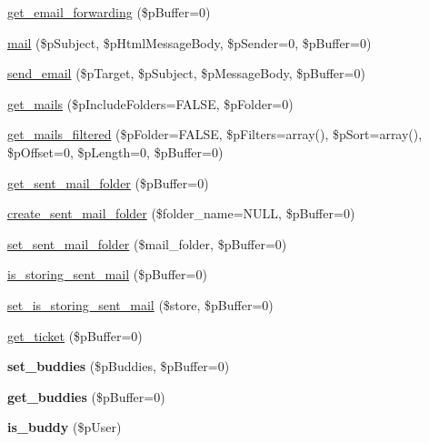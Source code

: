 \begin{DoxyCompactItemize}
\item 
\hyperlink{classsteam__user_a84e901020dbe6b08ec9b691afc1f3b4c}{get\_\-email\_\-forwarding} (\$pBuffer=0)
\item 
\hyperlink{classsteam__user_a590b6e07fd3ee5d89753bea3f21ae70f}{mail} (\$pSubject, \$pHtmlMessageBody, \$pSender=0, \$pBuffer=0)
\item 
\hyperlink{classsteam__user_aabd230d6d6fd52a056b9f89e94cf31a9}{send\_\-email} (\$pTarget, \$pSubject, \$pMessageBody, \$pBuffer=0)
\item 
\hyperlink{classsteam__user_a342e1ddf9c270fbaea22f87d6fb084cd}{get\_\-mails} (\$pIncludeFolders=FALSE, \$pFolder=0)
\item 
\hyperlink{classsteam__user_afb78b3bc39a24fd19682b82d062bf5b9}{get\_\-mails\_\-filtered} (\$pFolder=FALSE, \$pFilters=array(), \$pSort=array(), \$pOffset=0, \$pLength=0, \$pBuffer=0)
\item 
\hyperlink{classsteam__user_a19222c7377ee7f9427c07fa49d5e11ab}{get\_\-sent\_\-mail\_\-folder} (\$pBuffer=0)
\item 
\hyperlink{classsteam__user_a7af243958ad3814265ff0cf9ab12faac}{create\_\-sent\_\-mail\_\-folder} (\$folder\_\-name=NULL, \$pBuffer=0)
\item 
\hyperlink{classsteam__user_a75e778e4fd2942144bd681e93a71163e}{set\_\-sent\_\-mail\_\-folder} (\$mail\_\-folder, \$pBuffer=0)
\item 
\hyperlink{classsteam__user_a361f36a3eeaa680d7e2c039729b53f98}{is\_\-storing\_\-sent\_\-mail} (\$pBuffer=0)
\item 
\hyperlink{classsteam__user_a844872035a29de597a833d769b7940e6}{set\_\-is\_\-storing\_\-sent\_\-mail} (\$store, \$pBuffer=0)
\item 
\hyperlink{classsteam__user_ab1a2272339c82b292d9a2c945c35048f}{get\_\-ticket} (\$pBuffer=0)
\item 
\hypertarget{classsteam__user_acdbd66c3c1541effa33b1403bf171cb4}{
{\bfseries set\_\-buddies} (\$pBuddies, \$pBuffer=0)}
\label{classsteam__user_acdbd66c3c1541effa33b1403bf171cb4}

\item 
\hypertarget{classsteam__user_abb20b85ae4cf1e5a445a1d06ab7cee31}{
{\bfseries get\_\-buddies} (\$pBuffer=0)}
\label{classsteam__user_abb20b85ae4cf1e5a445a1d06ab7cee31}

\item 
\hypertarget{classsteam__user_ab3f7dee453909a36578d16b311e54320}{
{\bfseries is\_\-buddy} (\$pUser)}
\label{classsteam__user_ab3f7dee453909a36578d16b311e54320}


\end{DoxyCompactItemize}
